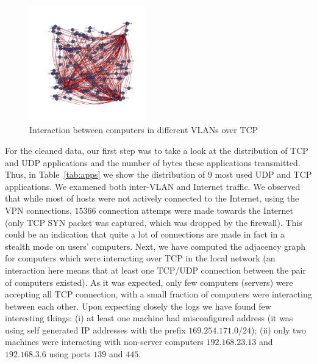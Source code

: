 \begin{figure}[!hbt]\centering
  \includegraphics[width=0.45\textwidth]{graphics/interaction_between_local_computers_over_tcp.pdf}
  \caption{Interaction between computers in different VLANs over TCP}
  \label{fig:interaction}
\end{figure}


For the cleaned data, our first step was to take a look at the distribution of TCP and UDP applications and the number of bytes these 
applications transmitted. Thus, in Table~\ref{tab:apps} we show the distribution of $9$ most used UDP and TCP applications. We examened 
both inter-VLAN and Internet traffic. We observed that while most of hosts were not actively connected to the Internet, using the VPN 
connections, $15366$ connection attemps were made towards the Internet (only TCP SYN packet was captured, which was dropped by the 
firewall). This could be an indication that quite a lot of connections are made in fact in a stealth mode on users' computers. Next, we 
have computed the adjacency graph for computers which were interacting over TCP in the local network (an interaction here means that at 
least one TCP/UDP connection between the pair of computers existed).  As it was expected, only few computers (servers) were accepting all TCP connection, with a small 
fraction of computers were interacting between each other. Upon expecting closely the logs we have found few interesting things: (i) at 
least one machine had misconfigured address (it was using self generated IP addresses with the prefix $169.254.171.0/24$); (ii) 
only two machines were interacting with non-server computers $192.168.23.13$ and $192.168.3.6$ using ports $139$ and $445$.

